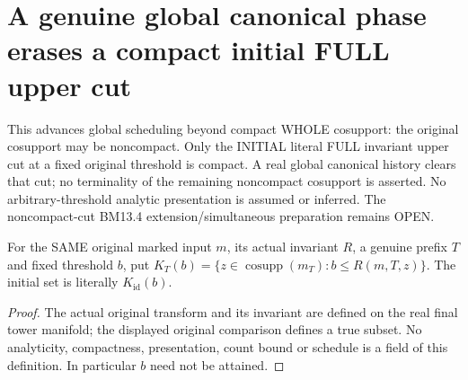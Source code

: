 \section{A genuine global canonical phase erases a compact initial FULL upper cut}

This advances global scheduling beyond compact WHOLE cosupport: the original
cosupport may be noncompact. Only the INITIAL literal FULL invariant upper
cut at a fixed original threshold is compact. A real global canonical history
clears that cut; no terminality of the remaining noncompact cosupport is
asserted. No arbitrary-threshold analytic presentation is assumed or inferred.
The noncompact-cut BM13.4 extension/simultaneous preparation remains OPEN.

\begin{definition}
\label{hir:original-compact-upper-cut-literal-object}
\leanok
For the SAME original marked input $m$, its actual invariant $R$, a genuine
prefix $T$ and fixed threshold $b$, put
$K_T(b)=\{z\in\operatorname{cosupp}(m_T):b\le R(m,T,z)\}$.
The initial set is literally $K_{\mathrm{id}}(b)$.
\end{definition}
\begin{proof}
The actual original transform and its invariant are defined on the real final
tower manifold; the displayed original comparison defines a true subset.
No analyticity, compactness, presentation, count bound or schedule is a
field of this definition. In particular $b$ need not be attained.
\end{proof}

